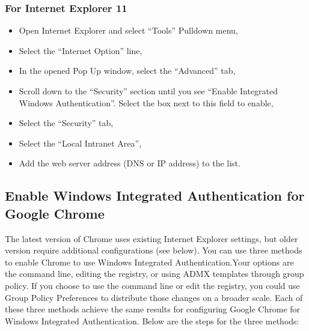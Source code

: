 \documentclass[letterpaper,10pt,english]{sphinxmanual}
\begin{document}
\subsubsection{For Internet Explorer 11}
\label{\detokenize{Customization:for-internet-explorer-11}}\begin{itemize}
\item {} 
\sphinxAtStartPar
Open Internet Explorer and select “Tools” Pull\sphinxhyphen{}down menu,

\item {} 
\sphinxAtStartPar
Select the “Internet Option” line,

\item {} 
\sphinxAtStartPar
In the opened Pop Up window, select the “Advanced” tab,

\item {} 
\sphinxAtStartPar
Scroll down to the “Security” section until you see “Enable Integrated Windows Authentication”. Select the box next to this field to enable,

\item {} 
\sphinxAtStartPar
Select the “Security” tab,

\item {} 
\sphinxAtStartPar
Select the “Local Intranet Area”,

\item {} 
\sphinxAtStartPar
Add the web server address (DNS or IP address) to the list.

\end{itemize}


\subsection{Enable Windows Integrated Authentication for Google Chrome}
\label{\detokenize{Customization:enable-windows-integrated-authentication-for-google-chrome}}
\sphinxAtStartPar
The latest version of Chrome uses existing Internet Explorer settings, but older version require additional configurations (see below). You can use three methods to enable Chrome to use Windows Integrated Authentication.Your options are the command line, editing the registry, or using ADMX templates through group policy. If you choose to use the command line or edit the registry, you could use Group Policy Preferences to distribute those changes on a broader scale. Each of these three methods achieve the same results for configuring Google Chrome for Windows Integrated Authentication. Below are the steps for the three methods:
\end{document}
